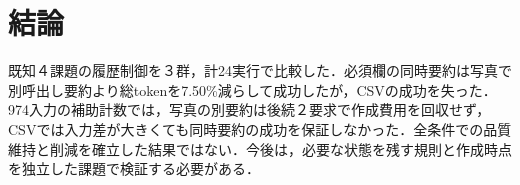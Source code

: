 \section{結論}
既知４課題の履歴制御を３群，計24実行で比較した．必須欄の同時要約は写真で別呼出し要約より総tokenを7.50\%減らして成功したが，CSVの成功を失った．974入力の補助計数では，写真の別要約は後続２要求で作成費用を回収せず，CSVでは入力差が大きくても同時要約の成功を保証しなかった．全条件での品質維持と削減を確立した結果ではない．今後は，必要な状態を残す規則と作成時点を独立した課題で検証する必要がある．
